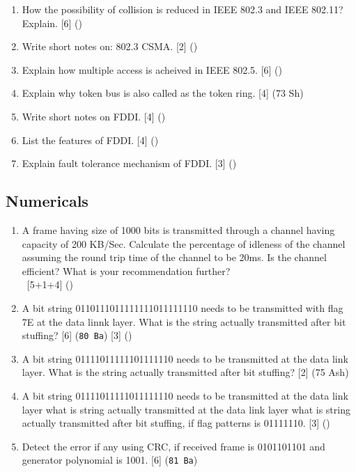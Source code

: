 \documentclass[12pt]{article}
\newcommand{\enter}{\\\textcolor{white}{1}}
\begin{document}
\begin{enumerate}[noitemsep, topsep=0pt]
			\item How the possibility of collision is reduced in IEEE 802.3 and IEEE 802.11? Explain. \hfill [6] ()

			\item Write short notes on: 802.3 CSMA. \hfill [2] ()
			
			\item Explain how multiple access is acheived in IEEE 802.5. \hfill[6] ()
			
			\item Explain why token bus is also called as the token ring. \hfill [4] (73 Sh)

			\item Write short notes on FDDI. \hfill [4] ()

			\item List the features of FDDI. \hfill [4] ()

			\item Explain fault tolerance mechanism of FDDI. \hfill [3] () 
		\end{enumerate}
			
	\subsection{Numericals}
		\begin{enumerate}[noitemsep, topsep=0pt]
			\item A frame having size of 1000 bits is transmitted through a channel having capacity of 200 KB/Sec. Calculate the percentage of idleness of the channel assuming the round trip time of the channel to be 20ms. Is the channel efficient? What is your recommendation further?
			\enter\hfill [5+1+4] () 

			\item A bit string 0110111011111111011111110 needs to be transmitted with flag 7E at the data linnk layer. What is the string actually transmitted after bit stuffing? \hfill [6] (\texttt{80 Ba}) [3] ()

			\item A bit string 01111011111101111110 needs to be transmitted at the data link layer. What is the string actually transmitted after bit stuffing? \hfill [2] (75 Ash)

			\item A bit string 01111011111011111110 needs to be transmitted at the data link layer what is string actually transmitted at the data  link layer what is string actually transmitted after bit stuffing, if flag patterns is 01111110. \hfill [3] ()
			
			\item Detect the error if any using CRC, if received frame is 0101101101 and generator polynomial is 1001. \hfill [6] (\texttt{81 Ba})
		\end{enumerate}
\end{document}

